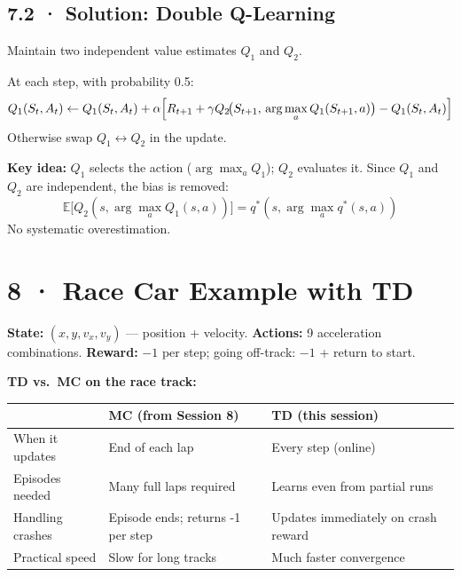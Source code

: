 \documentclass[11pt,a4paper]{article}
\begin{document}
\subsection*{7.2 · Solution: Double Q-Learning}

\begin{tcolorbox}[bold={Double Q-Learning — Separating Selection and Evaluation}]
Maintain two independent value estimates $Q_1$ and $Q_2$.

\medskip
At each step, with probability 0.5:
\[
  Q_1(S_t, A_t) \leftarrow Q_1(S_t, A_t)
    + \alpha\Bigl[R_{t+1} + \gamma Q_2\!\bigl(S_{t+1},\, \arg\max_a Q_1(S_{t+1}, a)\bigr)
      - Q_1(S_t, A_t)\Bigr]
\]
Otherwise swap $Q_1 \leftrightarrow Q_2$ in the update.

\medskip
\textbf{Key idea:} $Q_1$ selects the action ($\arg\max_a Q_1$); $Q_2$ evaluates it.
Since $Q_1$ and $Q_2$ are independent, the bias is removed:
\[
  \mathbb{E}\bigl[Q_2(s, \arg\max_a Q_1(s,a))\bigr] = q^*(s, \arg\max_a q^*(s,a))
\]
No systematic overestimation.
\end{tcolorbox}

\section*{8 · Race Car Example with TD}

\begin{tcolorbox}[defn={Race Track with SARSA and Q-Learning}]
\textbf{State:} $(x, y, v_x, v_y)$ — position + velocity.
\textbf{Actions:} 9 acceleration combinations.
\textbf{Reward:} $-1$ per step; going off-track: $-1$ + return to start.
\end{tcolorbox}

\textbf{TD vs.\ MC on the race track:}
\begin{center}\small
\begin{tabular}{p{3cm}p{5.5cm}p{5.5cm}}
\toprule
& \textbf{MC (from Session 8)} & \textbf{TD (this session)} \\
\midrule
When it updates & End of each lap & Every step (online) \\
Episodes needed & Many full laps required & Learns even from partial runs \\
Handling crashes & Episode ends; returns -1 per step & Updates immediately on crash reward \\
Practical speed & Slow for long tracks & Much faster convergence \\
\bottomrule
\end{tabular}
\end{center}
\end{document}
